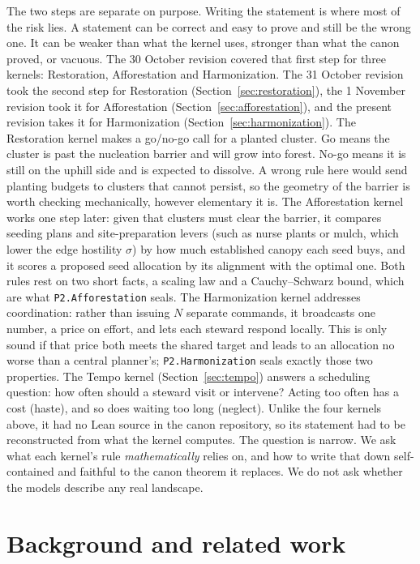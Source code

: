 \documentclass[11pt]{article}
\theoremstyle{definition}
\theoremstyle{remark}
\begin{document}
The two steps are separate on purpose. Writing the statement is where most of the risk lies.
A statement can be correct and easy to prove and still be the wrong one. It can be weaker than what the kernel uses,
stronger than what the canon proved, or vacuous. The 30 October revision covered that first step for three kernels:
Restoration, Afforestation and Harmonization.
The 31 October revision took the second step for Restoration (Section~\ref{sec:restoration}), the 1 November revision
took it for Afforestation (Section~\ref{sec:afforestation}), and the present revision takes it for Harmonization
(Section~\ref{sec:harmonization}).
The Restoration kernel makes a go/no-go call for a planted cluster. Go means the cluster is past the nucleation barrier
and will grow into forest. No-go means it is still on the uphill side and is expected to dissolve.
A wrong rule here would send planting budgets to clusters that cannot persist, so the geometry of the barrier is worth
checking mechanically, however elementary it is.
The Afforestation kernel works one step later: given that clusters must clear the barrier, it compares seeding plans and
site-preparation levers (such as nurse plants or mulch, which lower the edge hostility $\sigma$) by how much established canopy each seed buys,
and it scores a proposed seed allocation by its alignment with the optimal one.
Both rules rest on two short facts, a scaling law and a Cauchy--Schwarz bound, which are what \texttt{P2.Afforestation} seals.
The Harmonization kernel addresses coordination: rather than issuing $N$ separate commands, it broadcasts one number,
a price on effort, and lets each steward respond locally. This is only sound if that price both meets the shared target and
leads to an allocation no worse than a central planner's; \texttt{P2.Harmonization} seals exactly those two properties.
The Tempo kernel (Section~\ref{sec:tempo}) answers a scheduling question: how often should a steward visit or intervene?
Acting too often has a cost (haste), and so does waiting too long (neglect).
Unlike the four kernels above, it had no Lean source in the canon repository, so its statement had to be reconstructed from
what the kernel computes.
The question is narrow. We ask what each kernel's rule \emph{mathematically} relies on, and how to write that down
self-contained and faithful to the canon theorem it replaces. We do not ask whether the models describe any real landscape.

\section{Background and related work}
\end{document}
